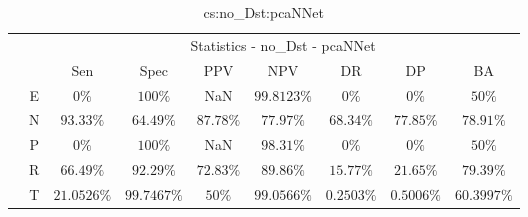 \begin{table}[!ht]
	\centering
	\begin{tabular}{|c|c|c|c|c|c|c|c|c|}
		\cline{3-9}
		\multicolumn{2}{c|}{} & \multicolumn{7}{c|}{Statistics - no_Dst - pcaNNet} \\ \cline{3-9}
		\multicolumn{2}{c|}{} & Sen & Spec & PPV & NPV & DR & DP & BA \\ \hline
		\multirow{5}{*}{\rotatebox{90}{Class}} & E & $0\%$ & $100\%$ & NaN & $99.8123\%$ & $0\%$ & $0\%$ & $50\%$ \\ \cline{2-9}
		 & N & $93.33\%$ & $64.49\%$ & $87.78\%$ & $77.97\%$ & $68.34\%$ & $77.85\%$ & $78.91\%$ \\ \cline{2-9}
		 & P & $0\%$ & $100\%$ & NaN & $98.31\%$ & $0\%$ & $0\%$ & $50\%$ \\ \cline{2-9}
		 & R & $66.49\%$ & $92.29\%$ & $72.83\%$ & $89.86\%$ & $15.77\%$ & $21.65\%$ & $79.39\%$ \\ \cline{2-9}
		 & T & $21.0526\%$ & $99.7467\%$ & $50\%$ & $99.0566\%$ & $0.2503\%$ & $0.5006\%$ & $60.3997\%$ \\ \hline
	\end{tabular}
	\caption{cs:no_Dst:pcaNNet}
	\label{tab:cs:no_Dst:pcaNNet}
\end{table}
